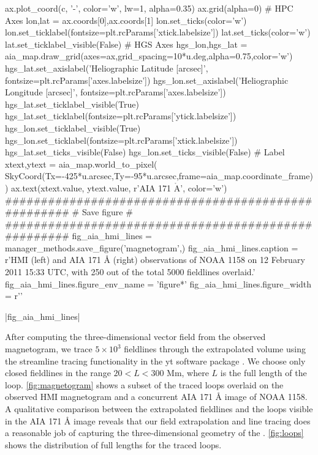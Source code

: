 \begin{pycode}
    ax.plot_coord(c, '-', color='w', lw=1, alpha=0.35)
ax.grid(alpha=0)
# HPC Axes
lon,lat = ax.coords[0],ax.coords[1]
lon.set_ticks(color='w')
lon.set_ticklabel(fontsize=plt.rcParams['xtick.labelsize'])
lat.set_ticks(color='w')
lat.set_ticklabel_visible(False)
# HGS Axes
hgs_lon,hgs_lat = aia_map.draw_grid(axes=ax,grid_spacing=10*u.deg,alpha=0.75,color='w')
hgs_lat.set_axislabel('Heliographic Latitude [arcsec]',
                      fontsize=plt.rcParams['axes.labelsize'])
hgs_lon.set_axislabel('Heliographic Longitude [arcsec]',
                      fontsize=plt.rcParams['axes.labelsize'])
hgs_lat.set_ticklabel_visible(True)
hgs_lat.set_ticklabel(fontsize=plt.rcParams['ytick.labelsize'])
hgs_lon.set_ticklabel_visible(True)
hgs_lon.set_ticklabel(fontsize=plt.rcParams['xtick.labelsize'])
hgs_lat.set_ticks_visible(False)
hgs_lon.set_ticks_visible(False)
# Label
xtext,ytext = aia_map.world_to_pixel(
    SkyCoord(Tx=-425*u.arcsec,Ty=-95*u.arcsec,frame=aia_map.coordinate_frame))
ax.text(xtext.value, ytext.value, r'AIA 171 $\mathrm{\mathring{A}}$', color='w')
####################################################
#                  Save figure                     #
####################################################
fig_aia_hmi_lines = manager_methods.save_figure('magnetogram',)
fig_aia_hmi_lines.caption = r'HMI (left) and AIA 171 \AA{} (right) observations of \AR{} NOAA 1158 on 12 February 2011 15:33 UTC, with 250 out of the total 5000 fieldlines overlaid.'
fig_aia_hmi_lines.figure_env_name = 'figure*'
fig_aia_hmi_lines.figure_width = r'\textwidth'
\end{pycode}
|fig_aia_hmi_lines|

After computing the three-dimensional vector field from the observed magnetogram, we trace $5\times10^3$ fieldlines through the extrapolated volume using the streamline tracing functionality in the yt software package \citep{turk_yt_2011}. We choose only closed fieldlines in the range $20<L<300$ Mm, where $L$ is the full length of the loop. \autoref{fig:magnetogram} shows a subset of the traced loops overlaid on the observed HMI magnetogram and a concurrent AIA 171 \AA{} image of NOAA 1158. A qualitative comparison between the extrapolated fieldlines and the loops visible in the AIA 171 \AA{} image reveals that our field extrapolation and line tracing does a reasonable job of capturing the three-dimensional geometry of the \AR{}. \autoref{fig:loops} shows the distribution of full lengths for the traced loops.

